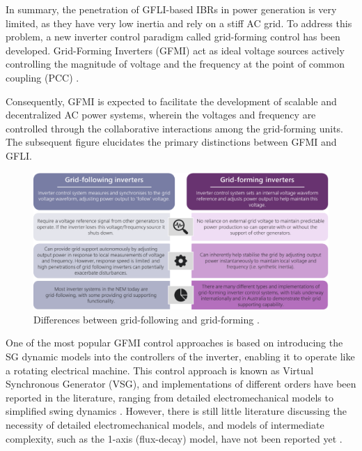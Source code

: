 In summary, the penetration of GFLI-based IBRs in power generation is very
limited, as they have very low inertia and rely on a stiff AC grid. To address
this problem, a new inverter control paradigm called grid-forming control has
been developed. Grid-Forming Inverters (GFMI) act as ideal voltage sources
actively controlling the magnitude of voltage and the frequency at the point of
common coupling (PCC) \cite{pattabiraman2018comparison}.

Consequently, GFMI is expected to facilitate the development of scalable and
decentralized AC power systems, wherein the voltages and frequency are
controlled through the collaborative interactions among the grid-forming units.
The subsequent figure elucidates the primary distinctions between GFMI and GFLI.

\begin{figure}[h!]
    \centering
    \includegraphics[width=14cm]{images/gfli_vs_gfmi.png}
    \caption{Differences between grid-following and grid-forming
    \cite{taylor2021application}.}
    \label{fig:gfli_vs_gfmi}
\end{figure}

One of the most popular GFMI control approaches is based on introducing the SG
dynamic models into the controllers of the inverter, enabling it to operate like
a rotating electrical machine. This control approach is known as Virtual
Synchronous Generator (VSG), and implementations of different orders have been
reported in the literature, ranging from detailed electromechanical models
\cite{beck2007vsm}\cite{zhang2013vsm} to simplified swing dynamics
\cite{zhong2011synchronverter}\cite{alipoor2015power}. However, there is still
little literature discussing the necessity of detailed electromechanical models,
and models of intermediate complexity, such as the 1-axis (flux-decay) model,
have not been reported yet \cite{chen2020modeling}.

